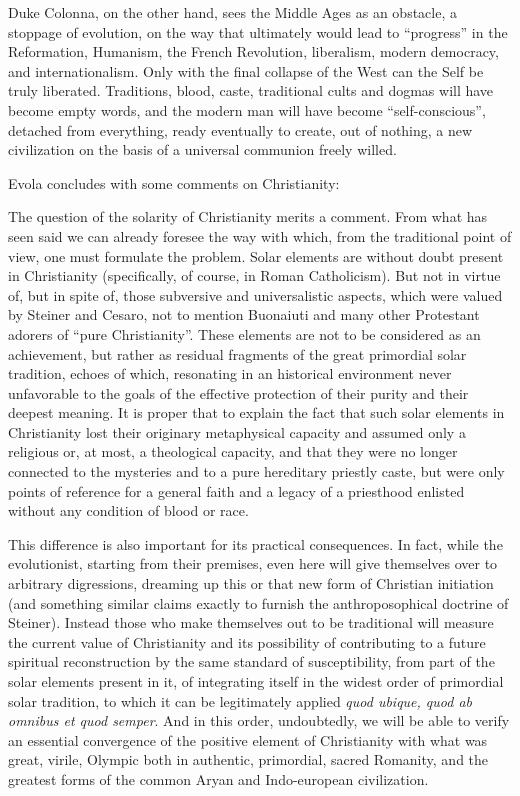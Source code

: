 Duke Colonna, on the other hand, sees the Middle Ages as an obstacle, a stoppage of evolution, on the way that ultimately would lead to ``progress'' in the Reformation, Humanism, the French Revolution, liberalism, modern democracy, and internationalism. Only with the final collapse of the West can the Self be truly liberated. Traditions, blood, caste, traditional cults and dogmas will have become empty words, and the modern man will have become ``self-conscious'', detached from everything, ready eventually to create, out of nothing, a new civilization on the basis of a universal communion freely willed.

Evola concludes with some comments on Christianity:

\begin{quotationx}
The question of the solarity of Christianity merits a comment. From what has seen said we can already foresee the way with which, from the traditional point of view, one must formulate the problem. Solar elements are without doubt present in Christianity (specifically, of course, in Roman Catholicism). But not in virtue of, but in spite of, those subversive and universalistic aspects, which were valued by Steiner and Cesaro, not to mention Buonaiuti and many other Protestant adorers of ``pure Christianity''. These elements are not to be considered as an achievement, but rather as residual fragments of the great primordial solar tradition, echoes of which, resonating in an historical environment never unfavorable to the goals of the effective protection of their purity and their deepest meaning. It is proper that to explain the fact that such solar elements in Christianity lost their originary metaphysical capacity and assumed only a religious or, at most, a theological capacity, and that they were no longer connected to the mysteries and to a pure hereditary priestly caste, but were only points of reference for a general faith and a legacy of a priesthood enlisted without any condition of blood or race.

This difference is also important for its practical consequences. In fact, while the evolutionist, starting from their premises, even here will give themselves over to arbitrary digressions, dreaming up this or that new form of Christian initiation (and something similar claims exactly to furnish the anthroposophical doctrine of Steiner). Instead those who make themselves out to be traditional will measure the current value of Christianity and its possibility of contributing to a future spiritual reconstruction by the same standard of susceptibility, from part of the solar elements present in it, of integrating itself in the widest order of primordial solar tradition, to which it can be legitimately applied \emph{quod ubique, quod ab omnibus et quod semper}. And in this order, undoubtedly, we will be able to verify an essential convergence of the positive element of Christianity with what was great, virile, Olympic both in authentic, primordial, sacred Romanity, and the greatest forms of the common Aryan and Indo-european civilization.
\end{quotationx}

